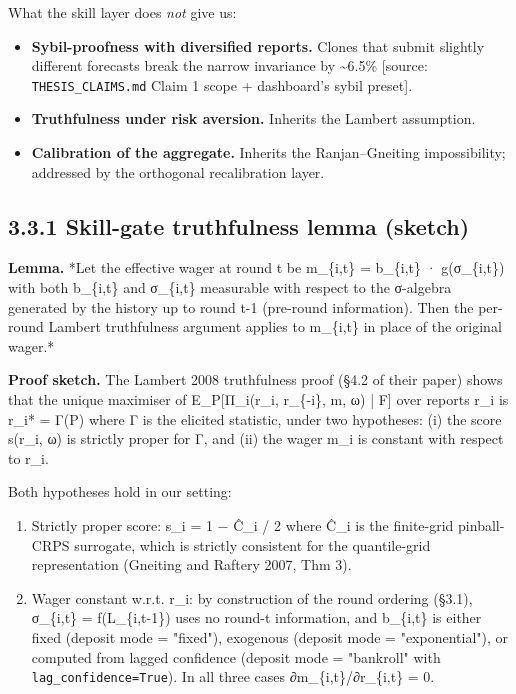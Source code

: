 \documentclass[11pt,a4paper,openany]{report}
\begin{document}
What the skill layer does \emph{not} give us:

\begin{itemize}
  \item \textbf{Sybil-proofness with diversified reports.} Clones that submit
    slightly different forecasts break the narrow invariance by \textasciitilde{}6.5\%
    [source: \texttt{THESIS\_CLAIMS.md} Claim 1 scope + dashboard's sybil preset].
  \item \textbf{Truthfulness under risk aversion.} Inherits the Lambert
    assumption.
  \item \textbf{Calibration of the aggregate.} Inherits the Ranjan–Gneiting
    impossibility; addressed by the orthogonal recalibration layer.
\end{itemize}

\subsection{3.3.1 Skill-gate truthfulness lemma (sketch)}

\textbf{Lemma.} *Let the effective wager at round t be m\_\{i,t\} = b\_\{i,t\} · g(σ\_\{i,t\})
with both b\_\{i,t\} and σ\_\{i,t\} measurable with respect to the σ-algebra
generated by the history up to round t-1 (pre-round information).
Then the per-round Lambert truthfulness argument applies to m\_\{i,t\} in
place of the original wager.*

\textbf{Proof sketch.} The Lambert 2008 truthfulness proof (§4.2 of their
paper) shows that the unique maximiser of E\_P[Π\_i(r\_i, r\_\{-i\}, m, ω) | F]
over reports r\_i is r\_i* = Γ(P) where Γ is the elicited statistic, under
two hypotheses: (i) the score s(r\_i, ω) is strictly proper for Γ, and
(ii) the wager m\_i is constant with respect to r\_i.

Both hypotheses hold in our setting:

\begin{enumerate}
  \item Strictly proper score: s\_i = 1 − Ĉ\_i / 2 where Ĉ\_i is the finite-grid
    pinball-CRPS surrogate, which is strictly consistent for the
    quantile-grid representation (Gneiting and Raftery 2007, Thm 3).
  \item Wager constant w.r.t. r\_i: by construction of the round ordering
    (§3.1), σ\_\{i,t\} = f(L\_\{i,t-1\}) uses no round-t information, and
    b\_\{i,t\} is either fixed (deposit mode = "fixed"), exogenous (deposit
    mode = "exponential"), or computed from lagged confidence (deposit
    mode = "bankroll" with \texttt{lag\_confidence=True}). In all three cases
    ∂m\_\{i,t\}/∂r\_\{i,t\} = 0.
\end{enumerate}
\end{document}
